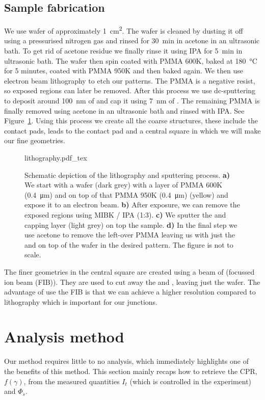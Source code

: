 \subsection{Sample fabrication}
\label{sec:method-sample-fabrication}
We use  wafer of approximately \qty{1}{\square\centi\meter}. The wafer is cleaned by dusting it off using a pressurised nitrogen gas and rinsed for \qty{30}{\minute} in acetone in an ultrasonic bath. To get rid of acetone residue we finally rinse it using IPA for \qty{5}{\minute} in ultrasonic bath. The wafer then spin coated with PMMA 600K, baked at \qty{180}{\celsius} for 5 minutes, coated with PMMA 950K and then baked again. We then use electron beam lithography to etch our patterns. The PMMA is a negative resist, so exposed regions can later be removed. After this process we use dc-sputtering to deposit around \qty{100}{\nano\meter} of  and cap it using \qty{7}{\nano\meter} of . The remaining PMMA is finally removed using acetone in an ultrasonic bath and rinsed with IPA. See Figure~\ref{fig:lithography}. Using this process we create all the coarse structures, these include the contact pads, leads to the contact pad and a central square in which we will make our fine geometries.

\begin{figure}[ht!]
	\centering
	\def\svgwidth{\textwidth}
	{lithography.pdf_tex}
	\caption{Schematic depiction of the lithography and sputtering process. \textbf{a)} We start with a  wafer (dark grey) with a layer of PMMA 600K (\qty{0.4}{\micro\meter}) and on top of that PMMA 950K (\qty{0.4}{\micro\meter}) (yellow) and expose it to an electron beam. \textbf{b)} After exposure, we can remove the exposed regions using MIBK / IPA (1:3). \textbf{c)} We sputter the  and  capping layer (light grey) on top the sample. \textbf{d)} In the final step we use acetone to remove the left-over PMMA leaving us with just the  and  on top of the wafer in the desired pattern. The figure is not to scale.}
	\label{fig:lithography}
\end{figure}

The finer geometries in the central square are created using a beam of  (focussed ion beam (FIB)). They are used to cut away the  and , leaving just the wafer. The advantage of use the FIB is that we can achieve a higher resolution compared to lithography which is important for our junctions.

\section{Analysis method}
Our method requires little to no analysis, which immediately highlights one of the benefits of this method. This section mainly recaps how to retrieve the CPR, $f(\gamma)$, from the measured quantities $I_t$ (which is controlled in the experiment) and $\Phi_s$.

